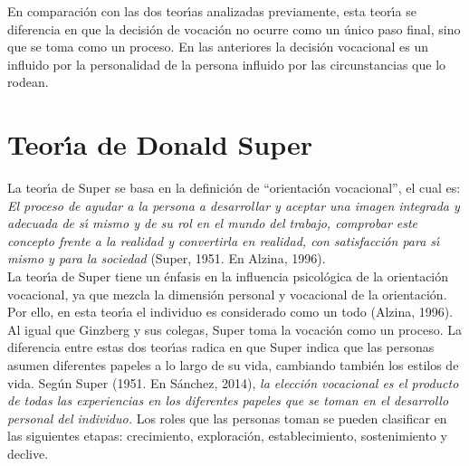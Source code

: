 En comparaci\'{o}n con las dos teor\'{\i}as analizadas previamente, esta teor\'{\i}a se diferencia en que la decisi\'{o}n de vocaci\'{o}n no ocurre como un \'{u}nico paso final, sino que se toma como un proceso. En las anteriores la decisi\'{o}n vocacional es un influido por la personalidad de la persona influido por las circunstancias que lo rodean.\\

\section{Teor\'{\i}a de Donald Super}
La teor\'{\i}a de Super se basa en la definici\'{o}n de \textquotedblleft orientaci\'{o}n vocacional\textquotedblright, el cual es:
\textit{El proceso de ayudar a la persona a desarrollar y aceptar una imagen integrada y adecuada de s\'{\i} mismo y de su rol en el mundo del trabajo, comprobar este concepto frente a la realidad y convertirla en realidad, con satisfacci\'{o}n para s\'{\i} mismo y para la sociedad} (Super, 1951. En Alzina, 1996).\\

La teor\'{\i}a de Super tiene un \'{e}nfasis en la influencia psicol\'{o}gica de la orientaci\'{o}n vocacional, ya que mezcla la dimensi\'{o}n personal y vocacional de la orientaci\'{o}n. Por ello, en esta teor\'{\i}a el individuo es considerado como un todo (Alzina, 1996).\\

Al igual que Ginzberg y sus colegas, Super toma la vocaci\'{o}n como un proceso. La diferencia entre estas dos teor\'{\i}as radica en que Super indica que las personas asumen diferentes papeles a lo largo de su vida, cambiando tambi\'{e}n los estilos de vida. Seg\'{u}n Super (1951. En S\'{a}nchez, 2014), \textit{la elecci\'{o}n vocacional es el producto de todas las experiencias en los diferentes papeles que se toman en el desarrollo personal del individuo.} Los roles que las personas toman se pueden clasificar en las siguientes etapas: crecimiento, exploraci\'{o}n, establecimiento, sostenimiento y declive.